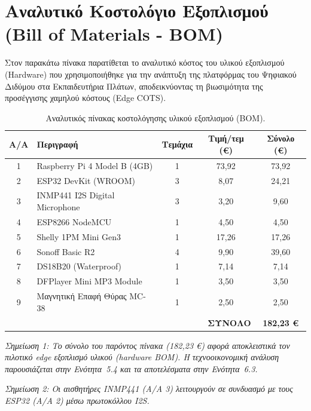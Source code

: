 \chapter{Αναλυτικό Κοστολόγιο Εξοπλισμού (\textlatin{Bill of Materials - BOM})}

Στον παρακάτω πίνακα παρατίθεται το αναλυτικό κόστος του υλικού εξοπλισμού (\textlatin{Hardware}) που χρησιμοποιήθηκε για την ανάπτυξη της πλατφόρμας του Ψηφιακού Διδύμου στα Εκπαιδευτήρια Πλάτων, αποδεικνύοντας τη βιωσιμότητα της προσέγγισης χαμηλού κόστους (\textlatin{Edge COTS}).

\begin{table}[htbp]
\centering
\caption{Αναλυτικός πίνακας κοστολόγησης υλικού εξοπλισμού (\textlatin{BOM}).}
\label{tab:appendix_bom}
\begin{tabular}{@{}cp{9.2cm}ccc@{}}
\toprule
\textbf{A/A} & \textbf{Περιγραφή} & \textbf{Τεμάχια} & \textbf{Τιμή/τεμ (\euro)} & \textbf{Σύνολο (\euro)} \\
\midrule
1 & \textlatin{Raspberry Pi 4 Model B (4GB)} & 1 & 73,92 & 73,92 \\
2 & \textlatin{ESP32 DevKit (WROOM)} & 3 & 8,07 & 24,21 \\
3 & \textlatin{INMP441 I\textlatin{2}S Digital Microphone} & 3 & 3,20 & 9,60 \\
4 & \textlatin{ESP8266 NodeMCU} & 1 & 4,50 & 4,50 \\
5 & \textlatin{Shelly 1PM Mini Gen3} & 1 & 17,26 & 17,26 \\
6 & \textlatin{Sonoff Basic R2} & 4 & 9,90 & 39,60 \\
7 & \textlatin{DS18B20 (Waterproof)} & 1 & 7,14 & 7,14 \\
8 & \textlatin{DFPlayer Mini MP3 Module} & 1 & 3,50 & 3,50 \\
9 & Μαγνητική Επαφή Θύρας \textlatin{MC-38} & 1 & 2,50 & 2,50 \\
\midrule
\multicolumn{4}{r}{\textbf{ΣΥΝΟΛΟ}} & \textbf{182,23 \euro} \\
\bottomrule
\end{tabular}
\end{table}

\noindent \textit{Σημείωση 1: Το σύνολο του παρόντος πίνακα (182,23 \euro) αφορά αποκλειστικά τον πιλοτικό \textlatin{edge} εξοπλισμό υλικού (\textlatin{hardware BOM}). Η τεχνοοικονομική ανάλυση παρουσιάζεται στην Ενότητα~5.4 και τα αποτελέσματα στην Ενότητα~6.3.}

\noindent \textit{Σημείωση 2: Οι αισθητήρες \textlatin{INMP441} (Α/Α 3) λειτουργούν σε συνδυασμό με τους \textlatin{ESP32} (Α/Α 2) μέσω πρωτοκόλλου \textlatin{I\textlatin{2}S}.}
